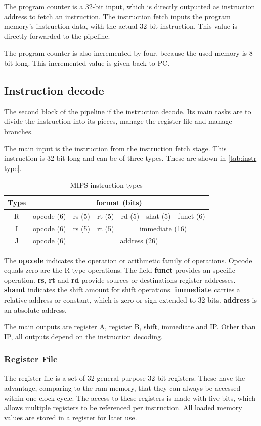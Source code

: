 The program counter is a 32-bit input, which is directly outputted as instruction address to fetch an instruction. The instruction fetch inputs the program memory's instruction data, 
with the actual 32-bit instruction. This value is directly forwarded to the pipeline.

The program counter is also incremented by four, because the used memory is 8-bit long. This incremented value is given back to PC.
\subsection{Instruction decode}
The second block of the pipeline if the instruction decode. Its main tasks are to divide the instruction into its pieces, manage the register file and manage branches.

The main input is the instruction from the instruction fetch stage. This instruction is 32-bit long and can be of three types. These are shown in \autoref{tab:instr type}.

\begin{table}[h!]
	\centering
	 \caption{MIPS instruction types}	
	\begin{tabular}{ccccccc}
		\toprule[2pt]
		\textbf{Type} & \multicolumn{6}{c}{\textbf{format (bits) }}   \\
		\toprule[2pt]
		R & opcode (6) & rs (5) & rt (5)   & rd (5) & shat (5) & funct (6) \\
		I & opcode (6) & rs (5) & rt (5)   & \multicolumn{3}{c}{ immediate (16)} \\
		J & opcode (6) & \multicolumn{5}{c}{ address (26)} \\	
		\bottomrule[2pt]
	\end{tabular} 
	\label{tab:instr type}
\end{table}

The \textbf{opcode} indicates the operation or arithmetic family of operations. Opcode equals zero are the R-type operations. The field \textbf{funct} provides an specific operation.
\textbf{rs}, \textbf{rt} and \textbf{rd} provide sources or destinations register addresses. \textbf{shamt} indicates the shift amount for shift operations. \textbf{immediate} carries
a relative address or constant, which is zero or sign extended to 32-bits. \textbf{address} is an absolute address.

The main outputs are register A, register B, shift, immediate and IP. Other than IP, all outputs depend on the instruction decoding.

\subsubsection{Register File}
The register file is a set of 32 general purpose 32-bit registers. These have the advantage, comparing to the ram memory, that they can always be accessed within one clock cycle.
The access to these registers is made with five bits, which allows multiple registers to be referenced per instruction. All loaded memory values are stored in a register
for later use.

